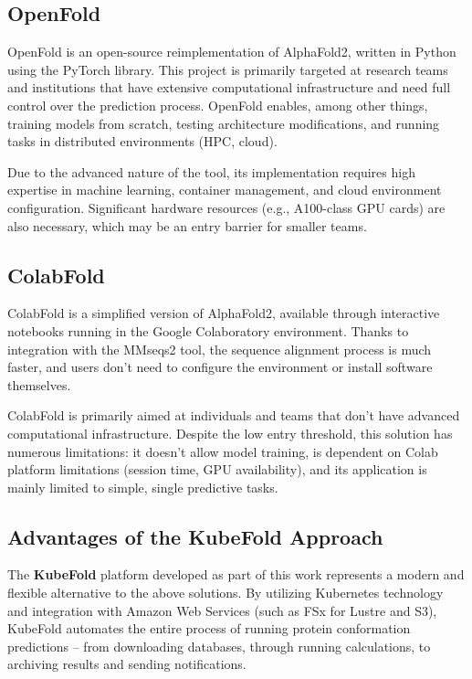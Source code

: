 \subsection*{OpenFold}

OpenFold is an open-source reimplementation of AlphaFold2, written in Python using the PyTorch library.
This project is primarily targeted at research teams and institutions that have extensive computational infrastructure and need full control over the prediction process.
OpenFold enables, among other things, training models from scratch, testing architecture modifications, and running tasks in distributed environments (HPC, cloud).

Due to the advanced nature of the tool, its implementation requires high expertise in machine learning, container management, and cloud environment configuration.
Significant hardware resources (e.g., A100-class GPU cards) are also necessary, which may be an entry barrier for smaller teams.

\subsection*{ColabFold}

ColabFold is a simplified version of AlphaFold2, available through interactive notebooks running in the Google Colaboratory environment.
Thanks to integration with the MMseqs2 tool, the sequence alignment process is much faster, and users don't need to configure the environment or install software themselves.

ColabFold is primarily aimed at individuals and teams that don't have advanced computational infrastructure.
Despite the low entry threshold, this solution has numerous limitations: it doesn't allow model training, is dependent on Colab platform limitations (session time, GPU availability), and its application is mainly limited to simple, single predictive tasks.

\subsection*{Advantages of the KubeFold Approach}

The \textbf{KubeFold} platform developed as part of this work represents a modern and flexible alternative to the above solutions.
By utilizing Kubernetes technology and integration with Amazon Web Services (such as FSx for Lustre and S3), KubeFold automates the entire process of running protein conformation predictions – from downloading databases, through running calculations, to archiving results and sending notifications.

